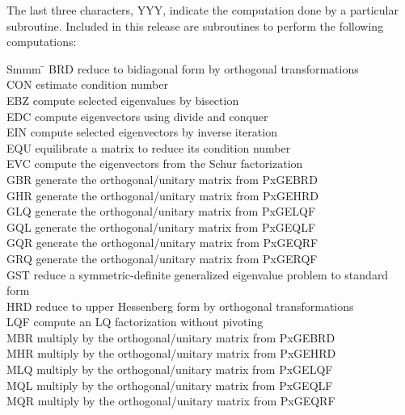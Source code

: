 \documentclass[11pt]{report}
\begin{document}
The last three characters, YYY, indicate the computation done by a
particular subroutine. 
Included in this release are subroutines
to perform the following computations:
\begin{tabbing}
Smmm \= \kill
BRD \>  reduce to bidiagonal form by orthogonal transformations \\
CON \>  estimate condition number\\
EBZ \>  compute selected eigenvalues by bisection \\
EDC \>  compute eigenvectors using divide and conquer \\
EIN \>  compute selected eigenvectors by inverse iteration \\
EQU \>  equilibrate a matrix to reduce its condition number \\
EVC \>  compute the eigenvectors from the Schur factorization \\
GBR \>  generate the orthogonal/unitary matrix from PxGEBRD \\
GHR \>  generate the orthogonal/unitary matrix from PxGEHRD \\
GLQ \>  generate the orthogonal/unitary matrix from PxGELQF \\
GQL \>  generate the orthogonal/unitary matrix from PxGEQLF \\
GQR \>  generate the orthogonal/unitary matrix from PxGEQRF \\
GRQ \>  generate the orthogonal/unitary matrix from PxGERQF \\
GST \>  reduce a symmetric-definite generalized eigenvalue problem to standard form \\
HRD \>  reduce to upper Hessenberg form by orthogonal transformations \\
LQF \>  compute an LQ factorization without pivoting \\
MBR \>  multiply by the orthogonal/unitary matrix from PxGEBRD \\
MHR \>  multiply by the orthogonal/unitary matrix from PxGEHRD \\
MLQ \>  multiply by the orthogonal/unitary matrix from PxGELQF \\
MQL \>  multiply by the orthogonal/unitary matrix from PxGEQLF \\
MQR \>  multiply by the orthogonal/unitary matrix from PxGEQRF \\

\end{tabbing}
\end{document}
